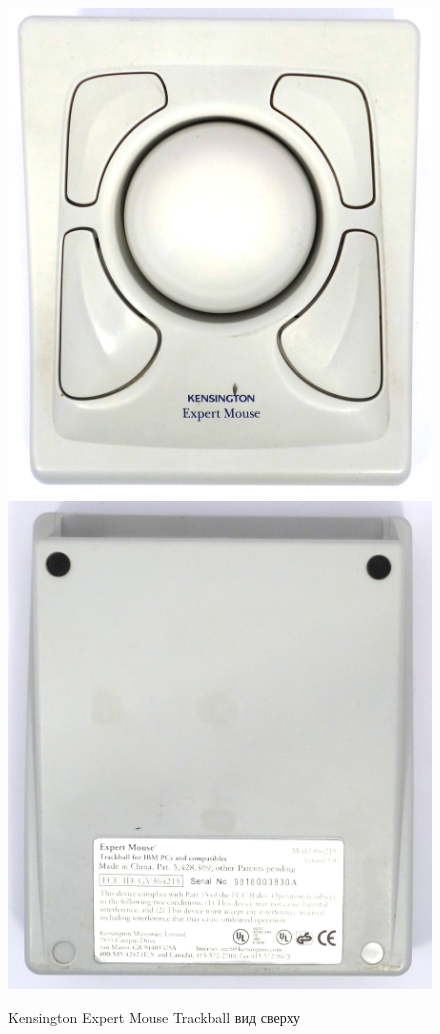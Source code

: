 \documentclass[11pt, a4paper]{article}
\begin{document}
\begin{figure}[h]
    \centering
    \includegraphics[scale=0.4]{1996_kensington_expert_trackball_5/top_30.jpg}
    \includegraphics[scale=0.4]{1996_kensington_expert_trackball_5/bottom_30.jpg}
    \caption{Kensington Expert Mouse Trackball вид сверху}
    \label{fig:ExpertMouseTopBottom}
\end{figure}
\end{document}
